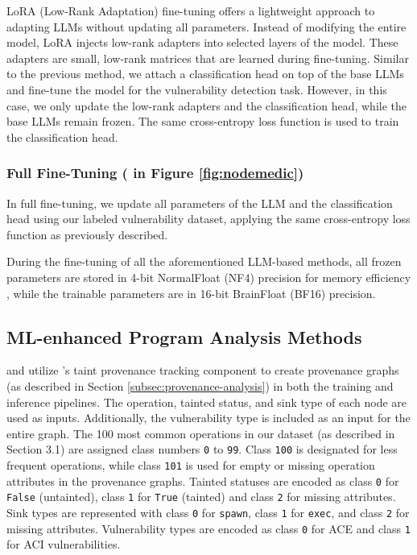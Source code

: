 \documentclass[12pt,openany,oneside,table]{cmuthesis}
\begin{document}
LoRA (Low-Rank Adaptation) fine-tuning \cite{lora, qlora} offers a lightweight approach to adapting LLMs without updating all parameters. Instead of modifying the entire model, LoRA injects low-rank adapters into selected layers of the model. These adapters are small, low-rank matrices that are learned during fine-tuning. Similar to the previous method, we attach a classification head on top of the base LLMs and fine-tune the model for the vulnerability detection task. However, in this case, we only update the low-rank adapters and the classification head, while the base LLMs remain frozen. The same cross-entropy loss function is used to train the classification head.

\subsubsection{Full Fine-Tuning \textup{( in Figure \ref{fig:nodemedic})}}

In full fine-tuning, we update all parameters of the LLM and the classification head using our labeled vulnerability dataset, applying the same cross-entropy loss function as previously described.

During the fine-tuning of all the aforementioned LLM-based methods, all frozen parameters are stored in 4-bit NormalFloat (NF4) precision for memory efficiency \cite{qlora}, while the trainable parameters are in 16-bit BrainFloat (BF16) precision.

\subsection{ML-enhanced Program Analysis Methods}

 and  utilize \nodemedic's
taint provenance tracking component to create provenance graphs (as described in Section \ref{subsec:provenance-analysis}) in both the training and inference pipelines. The operation, tainted status, and sink type of each node are used as inputs. Additionally, the vulnerability type is included as an input for the entire graph. The 100 most common operations in our dataset (as described in Section 3.1) are assigned class numbers \texttt{0} to \texttt{99}. Class \texttt{100} is designated for less frequent operations, while class \texttt{101} is used for empty or missing operation attributes in the provenance graphs. Tainted statuses are encoded as class \texttt{0} for \texttt{False} (untainted), class \texttt{1} for \texttt{True} (tainted) and class \texttt{2} for missing attributes. Sink types are represented with class \texttt{0} for \texttt{spawn}, class \texttt{1} for \texttt{exec}, and class \texttt{2} for missing attributes. Vulnerability types are encoded as class \texttt{0} for ACE and class \texttt{1} for ACI vulnerabilities.
\end{document}
